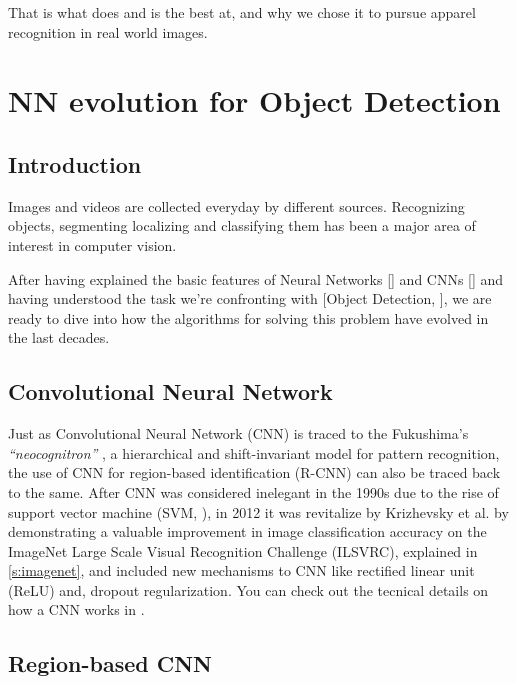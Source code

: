 That is what \maskrcnn does and is the best at, and why we chose it to pursue apparel recognition in real world images.



\section{NN evolution for Object Detection}\label{s:nnevo}

\subsection{Introduction}\label{s:nnevo-intro}

Images and videos are collected everyday by different sources. Recognizing objects, segmenting localizing and classifying them has been a major area of interest in computer vision. 

After having explained the basic features of Neural Networks [] and CNNs [] and having understood the task we're confronting with [Object Detection, ], we are ready to dive into how the algorithms for solving this problem have evolved in the last decades.

\subsection{Convolutional Neural Network}\label{s:nnevo-cnn}

Just as Convolutional Neural Network (CNN) is traced to the Fukushima’s \emph{ “neocognitron”} \cite{fukushima1980neocognitron}, a hierarchical and shift-invariant model for pattern recognition, the use of CNN for region-based identification (R-CNN)\cite{Girshick_2014} can also be traced back to the same.  After CNN was considered inelegant in the 1990s due to the rise of support vector machine (SVM, ), in 2012 it was revitalize by Krizhevsky et al. \cite{krizhevsky2012imagenet} by demonstrating a valuable improvement in image classification accuracy on the ImageNet Large Scale Visual Recognition Challenge (ILSVRC), explained in \ref{s:imagenet}, and included new mechanisms to CNN like rectified linear unit (ReLU) and, dropout regularization. You can check out the tecnical details on how a CNN works in .

\subsection{Region-based CNN}\label{s:nnevo-rcnn}

